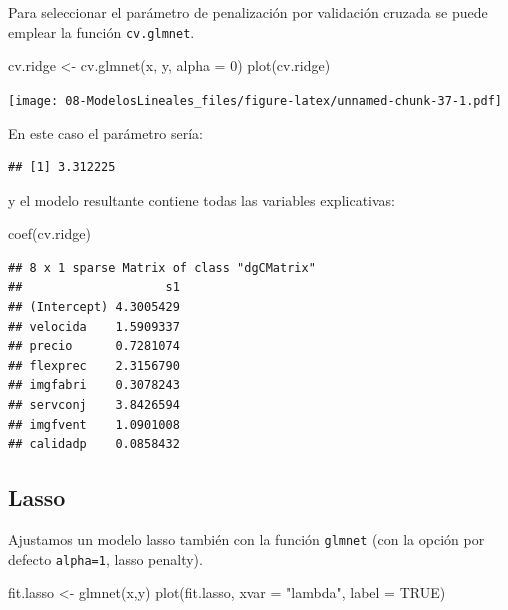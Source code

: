\documentclass[
]{book}
\newenvironment{Shaded}{\begin{snugshade}}{\end{snugshade}}
\newcommand{\AttributeTok}[1]{\textcolor[rgb]{0.77,0.63,0.00}{#1}}
\newcommand{\ConstantTok}[1]{\textcolor[rgb]{0.00,0.00,0.00}{#1}}
\newcommand{\DecValTok}[1]{\textcolor[rgb]{0.00,0.00,0.81}{#1}}
\newcommand{\FloatTok}[1]{\textcolor[rgb]{0.00,0.00,0.81}{#1}}
\newcommand{\FunctionTok}[1]{\textcolor[rgb]{0.00,0.00,0.00}{#1}}
\newcommand{\NormalTok}[1]{#1}
\newcommand{\OtherTok}[1]{\textcolor[rgb]{0.56,0.35,0.01}{#1}}
\newcommand{\SpecialCharTok}[1]{\textcolor[rgb]{0.00,0.00,0.00}{#1}}
\newcommand{\StringTok}[1]{\textcolor[rgb]{0.31,0.60,0.02}{#1}}
\theoremstyle{break}
\theoremstyle{nonumberplain}
\begin{document}
Para seleccionar el parámetro de penalización por validación cruzada se puede emplear
la función \texttt{cv.glmnet}.

\begin{Shaded}
\begin{Highlighting}[]
\NormalTok{cv.ridge }\OtherTok{\textless{}{-}} \FunctionTok{cv.glmnet}\NormalTok{(x, y, }\AttributeTok{alpha =} \DecValTok{0}\NormalTok{)}
\FunctionTok{plot}\NormalTok{(cv.ridge)}
\end{Highlighting}
\end{Shaded}

\texttt{[image: 08-ModelosLineales\_files/figure-latex/unnamed-chunk-37-1.pdf]}

En este caso el parámetro sería:

\begin{Shaded}
\end{Shaded}

\begin{verbatim}
## [1] 3.312225
\end{verbatim}

y el modelo resultante contiene todas las variables explicativas:

\begin{Shaded}
\begin{Highlighting}[]
\FunctionTok{coef}\NormalTok{(cv.ridge)}
\end{Highlighting}
\end{Shaded}

\begin{verbatim}
## 8 x 1 sparse Matrix of class "dgCMatrix"
##                    s1
## (Intercept) 4.3005429
## velocida    1.5909337
## precio      0.7281074
## flexprec    2.3156790
## imgfabri    0.3078243
## servconj    3.8426594
## imgfvent    1.0901008
## calidadp    0.0858432
\end{verbatim}

\hypertarget{lasso}{%
\subsection{Lasso}\label{lasso}}

Ajustamos un modelo lasso también con la función \texttt{glmnet} (con la opción por defecto \texttt{alpha=1}, lasso penalty).

\begin{Shaded}
\begin{Highlighting}[]
\NormalTok{fit.lasso }\OtherTok{\textless{}{-}} \FunctionTok{glmnet}\NormalTok{(x,y)}
\FunctionTok{plot}\NormalTok{(fit.lasso, }\AttributeTok{xvar =} \StringTok{"lambda"}\NormalTok{, }\AttributeTok{label =} \ConstantTok{TRUE}\NormalTok{)}
\end{Highlighting}
\end{Shaded}
\end{document}
